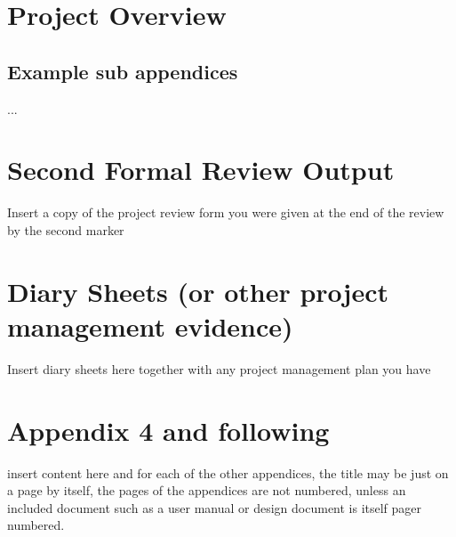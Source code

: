 \documentclass[12pt,a4paper]{article}
\begin{document}



\newpage
\begin{appendices}
\section{Project Overview}
\begin{subappendices}
\subsection{Example sub appendices}
...
\end{subappendices}

\section{Second Formal Review Output}
Insert a copy of the project review form you were given at the end of the review by the second marker

\section{Diary Sheets (or other project management evidence)}
Insert diary sheets here together with any project management plan you have

\section{Appendix 4 and following}
insert content here and for each of the other appendices, the title may be just on a page by itself, the pages of the appendices are not numbered, unless an included document such as a user manual or design document is itself pager numbered.
\end{appendices}
\end{document}
